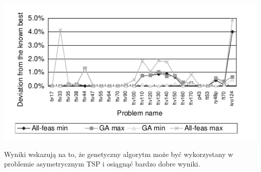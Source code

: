 \documentclass[11pt]{article}
\begin{document}
\begin{center}
\includegraphics[scale=.7]{mrs.png}
\end{center}
Wyniki wskazują na to, że genetyczny algorytm może być wykorzystany w problemie asymetrycznym TSP i osiągnąć bardzo dobre wyniki.
\end{document}

